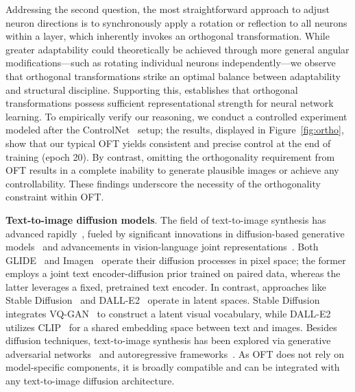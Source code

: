 \begin{itemize}[leftmargin=*,nosep]
\begin{itemize}[leftmargin=*,nosep]
Addressing the second question, the most straightforward approach to adjust neuron directions is to synchronously apply a rotation or reflection to all neurons within a layer, which inherently invokes an orthogonal transformation. While greater adaptability could theoretically be achieved through more general angular modifications—such as rotating individual neurons independently—we observe that orthogonal transformations strike an optimal balance between adaptability and structural discipline. Supporting this, \cite{liu2021orthogonal} establishes that orthogonal transformations possess sufficient representational strength for neural network learning. To empirically verify our reasoning, we conduct a controlled experiment modeled after the ControlNet~\cite{zhang2023adding} setup; the results, displayed in Figure~\ref{fig:ortho}, show that our typical OFT yields consistent and precise control at the end of training (epoch 20). By contrast, omitting the orthogonality requirement from OFT results in a complete inability to generate plausible images or achieve any controllability. These findings underscore the necessity of the orthogonality constraint within OFT.

\textbf{Text-to-image diffusion models}. The field of text-to-image synthesis has advanced rapidly~\cite{saharia2022photorealistic,ramesh2022hierarchical,rombach2022high,gu2022vector,nichol2022glide}, fueled by significant innovations in diffusion-based generative models~\cite{ho2020denoising,song2021score,song2021denoising,dhariwal2021diffusion} and advancements in vision-language joint representations~\cite{su2020vlbert,lu2019vilbert,radford2021learning,wang2021simvlm,li2022blip,li2023blip,alayrac2022flamingo,schuhmann2022laion}. Both GLIDE~\cite{nichol2022glide} and Imagen~\cite{saharia2022photorealistic} operate their diffusion processes in pixel space; the former employs a joint text encoder-diffusion prior trained on paired data, whereas the latter leverages a fixed, pretrained text encoder. In contrast, approaches like Stable Diffusion~\cite{rombach2022high} and DALL-E2~\cite{ramesh2022hierarchical} operate in latent spaces. Stable Diffusion integrates VQ-GAN~\cite{esser2021taming} to construct a latent visual vocabulary, while DALL-E2 utilizes CLIP~\cite{radford2021learning} for a shared embedding space between text and images. Besides diffusion techniques, text-to-image synthesis has been explored via generative adversarial networks~\cite{reed2016generative,zhang2017stackgan,xu2018attngan,li2019controllable} and autoregressive frameworks~\cite{ramesh2021zero,ding2021cogview,wu2022nuwa,yuscaling}. As OFT does not rely on model-specific components, it is broadly compatible and can be integrated with any text-to-image diffusion architecture.


\end{itemize}
\end{itemize}
